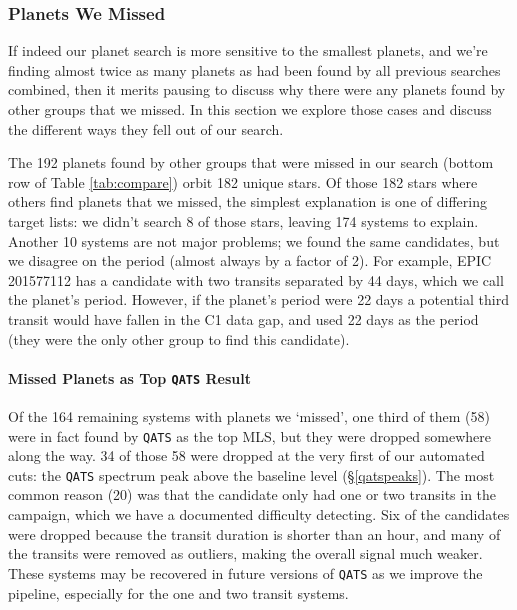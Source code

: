 \documentclass[twocolumn]{aastex62}
\newcommand{\pipeline}[1]{\texttt{#1}}
\newcommand{\nimissed}{192}
\newcommand{\nimissedstars}{182}
\begin{document}
\subsubsection{Planets We Missed}
\label{missed}

If indeed our planet search is more sensitive to the smallest planets,
and we're finding almost twice as many planets as had been found by
all previous searches combined, then it merits pausing to discuss why
there were any planets found by other groups that we missed. In this
section we explore those cases and discuss the different ways they
fell out of our search.

The \nimissed{} planets found by other groups that were missed in our
search (bottom row of Table \ref{tab:compare}) orbit \nimissedstars{}
unique stars. Of those \nimissedstars{} stars where others find
planets that we missed, the simplest explanation is one of differing
target lists: we didn't search 8 of those stars, leaving 174 systems
to explain. Another 10 systems are not major problems; we found the
same candidates, but we disagree on the period (almost always by a
factor of 2). For example, EPIC 201577112 has a candidate with two
transits separated by 44 days, which we call the planet's
period. However, if the planet's period were 22 days a potential third
transit would have fallen in the C1 data gap, and \cite{van16b} used
22 days as the period (they were the only other group to find this
candidate).


\paragraph{Missed Planets as Top \pipeline{QATS} Result}

Of the 164 remaining systems with planets we `missed', one third of
them (58) were in fact found by \pipeline{QATS} as the top MLS, but
they were dropped somewhere along the way. 34 of those 58 were dropped
at the very first of our automated cuts: the \pipeline{QATS} spectrum
peak above the baseline level (\S\ref{qatspeaks}). The most common
reason (20) was that the candidate only had one or two transits in the
campaign, which we have a documented difficulty detecting. Six of the
candidates were dropped because the transit duration is shorter than
an hour, and many of the transits were removed as outliers, making the
overall signal much weaker. These systems may be recovered in future
versions of \pipeline{QATS} as we improve the pipeline, especially for
the one and two transit systems.
\end{document}
